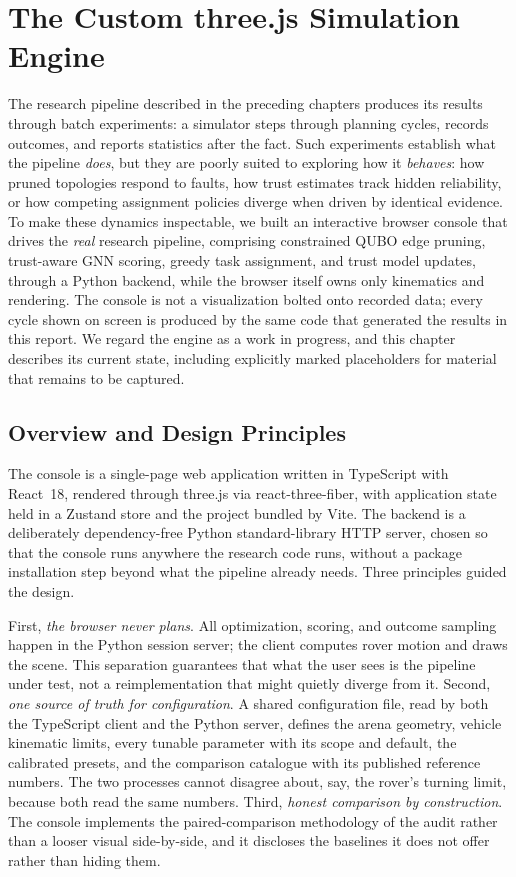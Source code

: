 \section{The Custom three.js Simulation Engine}
\label{sec:webengine}

The research pipeline described in the preceding chapters produces its
results through batch experiments: a simulator steps through planning
cycles, records outcomes, and reports statistics after the fact. Such
experiments establish what the pipeline \emph{does}, but they are poorly
suited to exploring how it \emph{behaves}: how pruned topologies respond to
faults, how trust estimates track hidden reliability, or how competing
assignment policies diverge when driven by identical evidence. To make
these dynamics inspectable, we built an interactive browser console that
drives the \emph{real} research pipeline, comprising constrained QUBO edge
pruning, trust-aware GNN scoring, greedy task assignment, and trust model
updates, through a Python backend, while the browser itself owns only
kinematics and rendering. The console is not a visualization bolted onto
recorded data; every cycle shown on screen is produced by the same code
that generated the results in this report. We regard the engine as a work
in progress, and this chapter describes its current state, including
explicitly marked placeholders for material that remains to be captured.


\subsection{Overview and Design Principles}

The console is a single-page web application written in TypeScript with
React~18, rendered through three.js via react-three-fiber, with
application state held in a Zustand store and the project bundled by Vite.
The backend is a deliberately dependency-free Python standard-library HTTP
server, chosen so that the console runs anywhere the research code runs,
without a package installation step beyond what the pipeline already needs.
Three principles guided the design.

First, \emph{the browser never plans}. All optimization, scoring, and
outcome sampling happen in the Python session server; the client computes
rover motion and draws the scene. This separation guarantees that what the
user sees is the pipeline under test, not a reimplementation that might
quietly diverge from it. Second, \emph{one source of truth for
configuration}. A shared configuration file, read by both the TypeScript
client and the Python server, defines the arena geometry, vehicle
kinematic limits, every tunable parameter with its scope and default, the
calibrated presets, and the comparison catalogue with its published
reference numbers. The two processes cannot disagree about, say, the
rover's turning limit, because both read the same numbers. Third,
\emph{honest comparison by construction}. The console implements the
paired-comparison methodology of the audit rather than a looser visual
side-by-side, and it discloses the baselines it does not offer rather than
hiding them.

